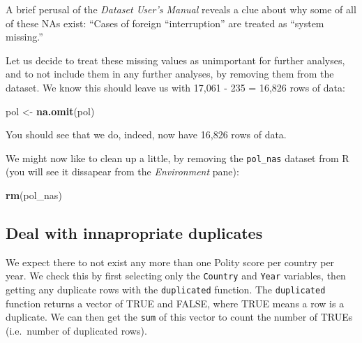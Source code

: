 \documentclass[]{book}
\newenvironment{Shaded}{\begin{snugshade}}{\end{snugshade}}
\newcommand{\KeywordTok}[1]{\textcolor[rgb]{0.13,0.29,0.53}{\textbf{#1}}}
\newcommand{\NormalTok}[1]{#1}
\newcommand{\OperatorTok}[1]{\textcolor[rgb]{0.81,0.36,0.00}{\textbf{#1}}}
\newcommand{\StringTok}[1]{\textcolor[rgb]{0.31,0.60,0.02}{#1}}
\begin{document}
A brief perusal of the \emph{Dataset User's Manual} reveals a clue about why some of all of these NAs exist: ``Cases of foreign ``interruption'' are treated as ``system missing.''

Let us decide to treat these missing values as unimportant for further analyses, and to not include them in any further analyses, by removing them from the dataset. We know this should leave us with 17,061 - 235 = 16,826 rows of data:

\begin{Shaded}
\begin{Highlighting}[]
\NormalTok{pol <-}\StringTok{ }\KeywordTok{na.omit}\NormalTok{(pol)}
\end{Highlighting}
\end{Shaded}

You should see that we do, indeed, now have 16,826 rows of data.

We might now like to clean up a little, by removing the \texttt{pol\_nas} dataset from R (you will see it dissapear from the \emph{Environment} pane):

\begin{Shaded}
\begin{Highlighting}[]
\KeywordTok{rm}\NormalTok{(pol_nas)}
\end{Highlighting}
\end{Shaded}

\hypertarget{deal-with-innapropriate-duplicates}{%
\subsection{Deal with innapropriate duplicates}\label{deal-with-innapropriate-duplicates}}

We expect there to not exist any more than one Polity score per country per year. We check this by first selecting only the \texttt{Country} and \texttt{Year} variables, then getting any duplicate rows with the \texttt{duplicated} function. The \texttt{duplicated} function returns a vector of TRUE and FALSE, where TRUE means a row is a duplicate. We can then get the \texttt{sum} of this vector to count the number of TRUEs (i.e.~number of duplicated rows).

\begin{Shaded}
\end{Shaded}
\end{document}

